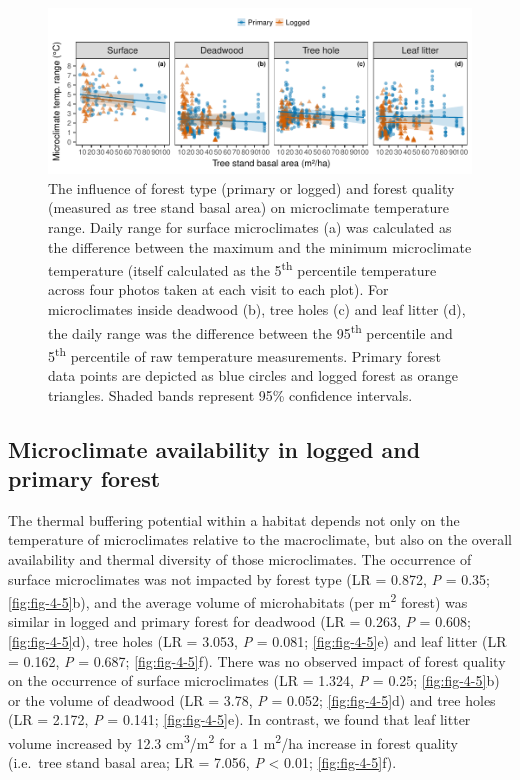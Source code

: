 \documentclass[12pt,a4paper,]{report}
\theoremstyle{definition}
\theoremstyle{definition}
\theoremstyle{definition}
\theoremstyle{remark}
\begin{document}
\begin{figure}

{\centering \includegraphics{./output/fig-4-4-1} 

}

\caption{The influence of forest type (primary or logged) and
forest quality (measured as tree stand basal area) on microclimate
temperature range. Daily range for surface microclimates (a) was
calculated as the difference between the maximum and the minimum
microclimate temperature (itself calculated as the 5\textsuperscript{th}
percentile temperature across four photos taken at each visit to each
plot). For microclimates inside deadwood (b), tree holes (c) and leaf
litter (d), the daily range was the difference between the
95\textsuperscript{th} percentile and 5\textsuperscript{th} percentile
of raw temperature measurements. Primary forest data points are depicted
as blue circles and logged forest as orange triangles. Shaded bands
represent 95\% confidence intervals.}\label{fig:fig-4-4}
\end{figure}

\subsection{Microclimate availability in logged and primary
forest}\label{microclimate-availability-in-logged-and-primary-forest}

The thermal buffering potential within a habitat depends not only on the
temperature of microclimates relative to the macroclimate, but also on
the overall availability and thermal diversity of those microclimates.
The occurrence of surface microclimates was not impacted by forest type
(LR = 0.872, \emph{P} = 0.35; \autoref{fig:fig-4-5}b), and the average
volume of microhabitats (per m\textsuperscript{2} forest) was similar in
logged and primary forest for deadwood (LR = 0.263, \emph{P} = 0.608;
\autoref{fig:fig-4-5}d), tree holes (LR = 3.053, \emph{P} = 0.081;
\autoref{fig:fig-4-5}e) and leaf litter (LR = 0.162, \emph{P} = 0.687;
\autoref{fig:fig-4-5}f). There was no observed impact of forest quality
on the occurrence of surface microclimates (LR = 1.324, \emph{P} = 0.25;
\autoref{fig:fig-4-5}b) or the volume of deadwood (LR = 3.78, \emph{P} =
0.052; \autoref{fig:fig-4-5}d) and tree holes (LR = 2.172, \emph{P} =
0.141; \autoref{fig:fig-4-5}e). In contrast, we found that leaf litter
volume increased by 12.3 cm\textsuperscript{3}/m\textsuperscript{2} for
a 1 m\textsuperscript{2}/ha increase in forest quality (i.e.~tree stand
basal area; LR = 7.056, \emph{P} \textless{} 0.01;
\autoref{fig:fig-4-5}f).
\end{document}

